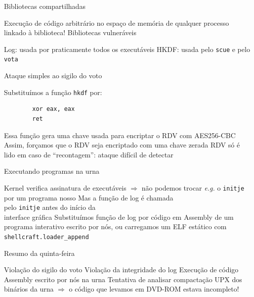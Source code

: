 \documentclass[14pt]{beamer}
\begin{document}
\begin{frame}{Bibliotecas compartilhadas}
  \begin{fullpageitemize}
    \itemR Execução de código arbitrário no espaço de memória de qualquer processo linkado à biblioteca!
    \itemR Bibliotecas vulneráveis
    \begin{itemize}
      \itemR Log: usada por praticamente todos os executáveis
      \itemR HKDF: usada pelo \texttt{scue} e pelo \texttt{vota}
    \end{itemize}
  \end{fullpageitemize}
\end{frame}

\begin{frame}[fragile]{Ataque simples ao sigilo do voto}
  \begin{fullpageitemize}
    \itemR Substituímos a função \texttt{hkdf} por:
      \begin{verbatim}
        xor eax, eax
        ret
      \end{verbatim}
    \vfill
    \itemR Essa função gera uma chave usada para encriptar o RDV com AES256-CBC
    \itemR Assim, forçamos que o RDV seja encriptado com uma chave zerada
    \itemR RDV só é lido em caso de ``recontagem'': ataque difícil de detectar
  \end{fullpageitemize}
\end{frame}

\begin{frame}{Executando programas na urna}
  \begin{fullpageitemize}
    \itemR Kernel verifica assinatura de executáveis $\Rightarrow$ não podemos trocar \textit{e.g.} o \texttt{initje} por um programa nosso
    \itemR Mas a função de log é chamada\\ pelo \texttt{initje} antes do início da \\interface gráfica
    \itemR Substituímos função de log por código em Assembly de um programa interativo escrito por nós, ou carregamos um ELF estático com \texttt{shellcraft.loader\_append}
  \end{fullpageitemize}
\end{frame}

\begin{frame}{Resumo da quinta-feira}
  \begin{fullpageitemize}
    \itemR Violação do sigilo do voto
    \itemR Violação da integridade do log
    \itemR Execução de código Assembly escrito por nós na urna
    \itemR Tentativa de analisar compactação UPX dos binários da urna $\Rightarrow$ o código que levamos em DVD-ROM estava incompleto!
  \end{fullpageitemize}
\end{frame}
\end{document}
